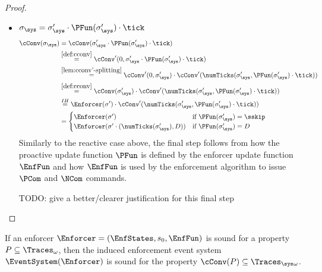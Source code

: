 \begin{proof}
\begin{itemize}
\begin{itemize}
            \item $\sigma_\sys = \sigma_\sys' \cdot \PFun(\sigma_\sys') \cdot \tick$
            \begin{align*}
                \cConv(\sigma_\sys)
                &= \cConv(\sigma_\sys' \cdot \PFun(\sigma_\sys') \cdot \tick) \\
                &\stackrel{\ref{def:cconv}}{=}
                    \cConv'(0, \sigma_\sys' \cdot \PFun(\sigma_\sys') \cdot \tick) \\
                &\stackrel{\ref{lem:cconv'-splitting}}{=}
                    \cConv'(0, \sigma_\sys') \cdot
                    \cConv'(\numTicks(\sigma_\sys',
                    \PFun(\sigma_\sys') \cdot \tick)) \\
                &\stackrel{\ref{def:cconv}}{=}
                    \cConv(\sigma_\sys') \cdot
                    \cConv'(\numTicks(\sigma_\sys',
                    \PFun(\sigma_\sys') \cdot \tick)) \\
                &\stackrel{IH}{=}
                    \Enforcer(\sigma') \cdot
                    \cConv'(\numTicks(\sigma_\sys',
                    \PFun(\sigma_\sys') \cdot \tick)) \\
                &= \begin{cases}
                    \Enforcer(\sigma')
                        &\text{if } \PFun(\sigma_\sys')  = \sskip \\
                    \Enforcer(\sigma' \cdot (\numTicks(\sigma_\sys'), D))
                        &\text{if } \PFun(\sigma_\sys') = D
                \end{cases}
            \end{align*}
            Similarly to the reactive case above, the final step follows
            from how the proactive update function $\PFun$ is defined
            by the enforcer update function $\EnfFun$ and
            how $\EnfFun$ is used by the enforcement algorithm to
            issue $\PCom$ and $\NCom$ commands.
            
            TODO: give a better/clearer justification for this final step
        \end{itemize}
    \end{itemize}
\end{proof}

\begin{theorem}
    \label{theo:induced-enforcement-event-system-soundness}
    If an enforcer $\Enforcer = (\EnfStates, s_0, \EnfFun)$ is sound for a
    property $P \subseteq \Traces_\omega$, then the induced enforcement event
    system $\EventSystem(\Enforcer)$ is sound for the property
    $\cConv(P) \subseteq \Traces_{\sys \omega}$.
\end{theorem}

